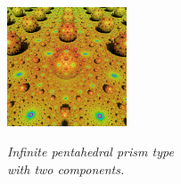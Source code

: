 \begin{figure}[h!tbp]
\begin{minipage}[t]{0.5\textwidth}
\begin{minipage}[t]{0.24\textwidth}
   \label{fig:semi-prism-glow}
  \end{minipage}
  \hspace*{\fill}
  \begin{minipage}[t]{0.24\textwidth}
   \centering
   \includegraphics[width=1.4in, height=1.4in, keepaspectratio]{./img/application/sphairahedron/variations/pentahedralPrism/glowPrismLimit.jpg}
   \label{fig:semi-prism-glow-limit}
  \end{minipage}
  \hspace*{\fill}
  \caption{\textit{Infinite pentahedral prism type \\with two components.}}
  \label{fig:semi-sphaira-glow}
 \end{minipage}
\end{figure}

